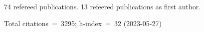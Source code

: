 74 refereed publications. 13 refeered publications as first author.

Total citations~=~3295; h-index~=~32 (2023-05-27)